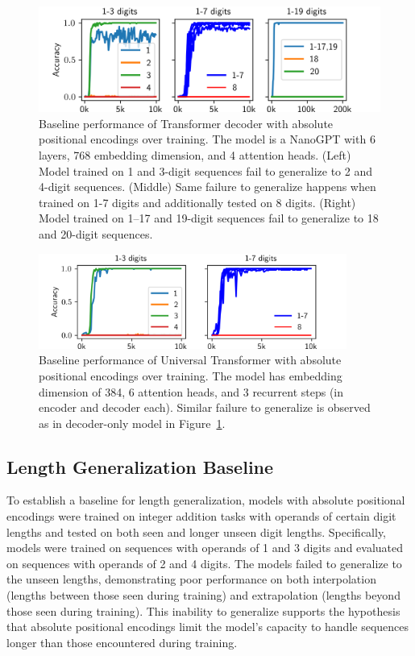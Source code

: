 \begin{figure}[!h]
    \centering
    \includegraphics[width=\textwidth]{fig/baseline_and_longer.png}
    \caption{Baseline performance of Transformer decoder with absolute positional encodings over training. The model is a NanoGPT with 6 layers, 768 embedding dimension, and 4 attention heads. (Left) Model trained on 1 and 3-digit sequences fail to generalize to 2 and 4-digit sequences. (Middle) Same failure to generalize happens when trained on 1-7 digits and additionally tested on 8 digits. (Right) Model trained on 1--17 and 19-digit sequences fail to generalize to 18 and 20-digit sequences.}
    \label{fig:baseline_and_longer}
\end{figure}

\begin{figure}[!h]
    \centering
    \includegraphics[width=0.9\textwidth]{fig/baseline_and_longer_ut.png}
    \caption{Baseline performance of Universal Transformer with absolute positional encodings over training. The model has embedding dimension of 384, 6 attention heads, and 3 recurrent steps (in encoder and decoder each). Similar failure to generalize is observed as in decoder-only model in Figure~\ref{fig:baseline_and_longer}.}
    \label{fig:baseline_and_longer_ut}
\end{figure}

\subsection{Length Generalization Baseline}\label{subsec:length_generalization_baseline}

To establish a baseline for length generalization, models with absolute positional encodings were trained on integer addition tasks with operands of certain digit lengths and tested on both seen and longer unseen digit lengths. Specifically, models were trained on sequences with operands of 1 and 3 digits and evaluated on sequences with operands of 2 and 4 digits. The models failed to generalize to the unseen lengths, demonstrating poor performance on both interpolation (lengths between those seen during training) and extrapolation (lengths beyond those seen during training). This inability to generalize supports the hypothesis that absolute positional encodings limit the model's capacity to handle sequences longer than those encountered during training.


